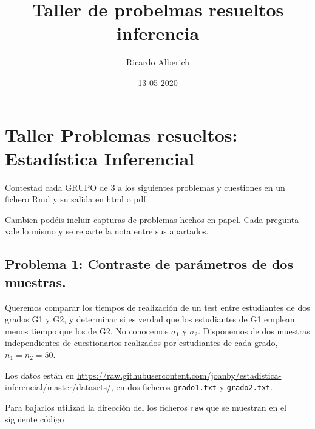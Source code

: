 \documentclass[
]{article}
\title{Taller de probelmas resueltos inferencia}
\author{Ricardo Alberich}
\date{13-05-2020}
\begin{document}
\maketitle

{
\hypersetup{linkcolor=blue}
\setcounter{tocdepth}{2}
\tableofcontents
}
\hypertarget{taller-problemas-resueltos-estaduxedstica-inferencial}{%
\section{Taller Problemas resueltos: Estadística
Inferencial}\label{taller-problemas-resueltos-estaduxedstica-inferencial}}

Contestad cada GRUPO de 3 a los siguientes problemas y cuestiones en un
fichero Rmd y su salida en html o pdf.

Cambien podéis incluir capturas de problemas hechos en papel. Cada
pregunta vale lo mismo y se reparte la nota entre sus apartados.

\hypertarget{problema-1-contraste-de-paruxe1metros-de-dos-muestras.}{%
\subsection{Problema 1: Contraste de parámetros de dos
muestras.}\label{problema-1-contraste-de-paruxe1metros-de-dos-muestras.}}

Queremos comparar los tiempos de realización de un test entre
estudiantes de dos grados G1 y G2, y determinar si es verdad que los
estudiantes de G1 emplean menos tiempo que los de G2. No conocemos
\(\sigma_1\) y \(\sigma_2\). Disponemos de dos muestras independientes
de cuestionarios realizados por estudiantes de cada grado,
\(n_1=n_2=50\).

Los datos están en
\url{https://raw.githubusercontent.com/joanby/estadistica-inferencial/master/datasets/},
en dos ficheros \texttt{grado1.txt} y \texttt{grado2.txt}.

Para bajarlos utilizad la dirección del los ficheros \texttt{raw} que se
muestran en el siguiente código
\end{document}
